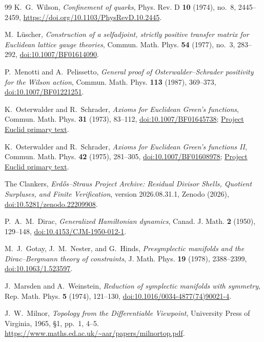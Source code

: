 \begin{thebibliography}{99}
\begingroup
\setlength{\emergencystretch}{3em}
\sloppy
K.~G.~Wilson,
\emph{Confinement of quarks},
Phys. Rev. D \textbf{10} (1974), no.~8, 2445--2459,
\url{https://doi.org/10.1103/PhysRevD.10.2445}.
\par\endgroup

M.~L\"uscher,
\emph{Construction of a selfadjoint, strictly positive transfer matrix for
Euclidean lattice gauge theories},
Commun. Math. Phys. \textbf{54} (1977), no.~3, 283--292,
\href{https://doi.org/10.1007/BF01614090}{doi:10.1007/BF01614090}.

P.~Menotti and A.~Pelissetto,
\emph{General proof of Osterwalder--Schrader positivity for the Wilson
action},
Commun. Math. Phys. \textbf{113} (1987), 369--373,
\href{https://doi.org/10.1007/BF01221251}{doi:10.1007/BF01221251}.

K.~Osterwalder and R.~Schrader,
\emph{Axioms for Euclidean Green's functions},
Commun. Math. Phys. \textbf{31} (1973), 83--112,
\href{https://doi.org/10.1007/BF01645738}{doi:10.1007/BF01645738};
\href{https://projecteuclid.org/euclid.cmp/1103858969}%
{Project Euclid primary text}.

K.~Osterwalder and R.~Schrader,
\emph{Axioms for Euclidean Green's functions II},
Commun. Math. Phys. \textbf{42} (1975), 281--305,
\href{https://doi.org/10.1007/BF01608978}{doi:10.1007/BF01608978};
\href{https://projecteuclid.org/euclid.cmp/1103899050}%
{Project Euclid primary text}.

The Clankers,
\emph{Erd\H{o}s--Straus Project Archive: Residual Divisor Shells, Quotient
Surpluses, and Finite Verification}, version 2026.08.31.1, Zenodo (2026),
\href{https://doi.org/10.5281/zenodo.22209908}%
{doi:10.5281/zenodo.22209908}.

P.~A.~M.~Dirac,
\emph{Generalized Hamiltonian dynamics},
Canad. J. Math. \textbf{2} (1950), 129--148,
\href{https://doi.org/10.4153/CJM-1950-012-1}%
{doi:10.4153/CJM-1950-012-1}.

M.~J.~Gotay, J.~M.~Nester, and G.~Hinds,
\emph{Presymplectic manifolds and the Dirac--Bergmann theory of constraints},
J. Math. Phys. \textbf{19} (1978), 2388--2399,
\href{https://doi.org/10.1063/1.523597}{doi:10.1063/1.523597}.

J.~Marsden and A.~Weinstein,
\emph{Reduction of symplectic manifolds with symmetry},
Rep. Math. Phys. \textbf{5} (1974), 121--130,
\href{https://doi.org/10.1016/0034-4877(74)90021-4}%
{doi:10.1016/0034-4877(74)90021-4}.


J.~W.~Milnor, \emph{Topology from the Differentiable Viewpoint},
University Press of Virginia, 1965, \S1, pp.~1, 4--5.
\url{https://www.maths.ed.ac.uk/~aar/papers/milnortop.pdf}.
\end{thebibliography}
